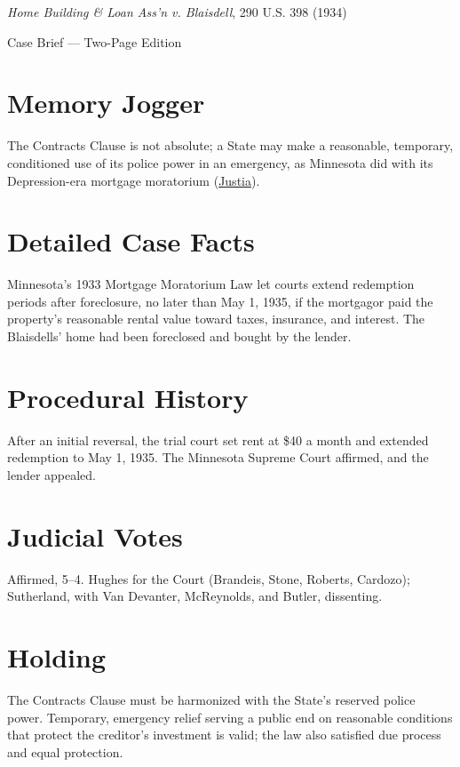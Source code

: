\documentclass[12pt]{article}
\begin{document}
\begin{center}
{\LARGE \textit{Home Building \& Loan Ass'n v. Blaisdell}, 290 U.S. 398 (1934)\par}
\vspace{0.5em}
{\large Case Brief --- Two-Page Edition\par}
\end{center}

\section{Memory Jogger}
The Contracts Clause is not absolute; a State may make a reasonable, temporary, conditioned use of its police power in an emergency, as Minnesota did with its Depression-era mortgage moratorium (\href{https://supreme.justia.com/cases/federal/us/290/398/}{Justia}).

\section{Detailed Case Facts}
Minnesota's 1933 Mortgage Moratorium Law let courts extend redemption periods after foreclosure, no later than May 1, 1935, if the mortgagor paid the property's reasonable rental value toward taxes, insurance, and interest. The Blaisdells' home had been foreclosed and bought by the lender.

\section{Procedural History}
After an initial reversal, the trial court set rent at \$40 a month and extended redemption to May 1, 1935. The Minnesota Supreme Court affirmed, and the lender appealed.

\section{Judicial Votes}
Affirmed, 5--4. Hughes for the Court (Brandeis, Stone, Roberts, Cardozo); Sutherland, with Van Devanter, McReynolds, and Butler, dissenting.

\section{Holding}
The Contracts Clause must be harmonized with the State's reserved police power. Temporary, emergency relief serving a public end on reasonable conditions that protect the creditor's investment is valid; the law also satisfied due process and equal protection.
\end{document}
